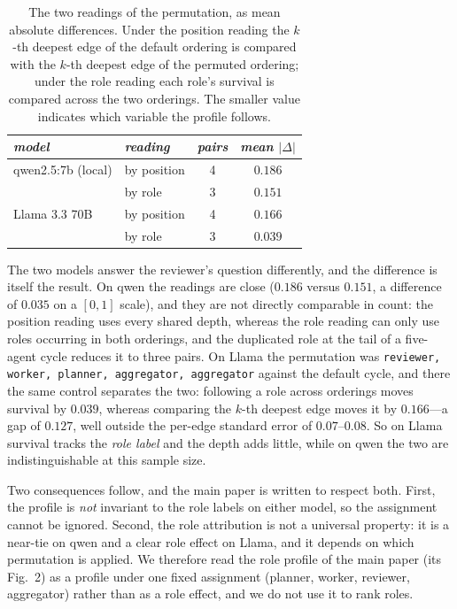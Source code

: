 \documentclass[sigconf,anonymous]{aamas}
\begin{document}
\begin{table}[h]
\scriptsize
\centering
\caption{The two readings of the permutation, as mean absolute differences. Under
the position reading the $k$-th deepest edge of the default ordering is compared with
the $k$-th deepest edge of the permuted ordering; under the role reading each role's
survival is compared across the two orderings. The smaller value indicates which
variable the profile follows.}
\vspace{4pt}
\label{tab:role-perm-readings}
\begin{tabular}{llcc}
\toprule
\textit{model} & \textit{reading} & \textit{pairs} & \textit{mean $|\Delta|$} \\
\midrule
qwen2.5:7b (local) & by position & 4 & $0.186$ \\
                   & by role     & 3 & $0.151$ \\
\midrule
Llama 3.3 70B      & by position & 4 & $0.166$ \\
                   & by role     & 3 & $\mathbf{0.039}$ \\
\bottomrule
\end{tabular}
\end{table}

The two models answer the reviewer's question differently, and the difference is itself
the result. On qwen the readings are close ($0.186$ versus $0.151$, a difference of
$0.035$ on a $[0,1]$ scale), and they are not directly comparable in count: the position
reading uses every shared depth, whereas the role reading can only use roles occurring in
both orderings, and the duplicated role at the tail of a five-agent cycle reduces it to
three pairs. On Llama the permutation was \texttt{reviewer, worker, planner, aggregator,
aggregator} against the default cycle, and there the same control separates the two:
following a role across orderings moves survival by $0.039$, whereas comparing the
$k$-th deepest edge moves it by $0.166$---a gap of $0.127$, well outside the per-edge
standard error of $0.07$--$0.08$. So on Llama survival tracks the \emph{role label} and
the depth adds little, while on qwen the two are indistinguishable at this sample size.

Two consequences follow, and the main paper is written to respect both. First, the
profile is \emph{not} invariant to the role labels on either model, so the assignment
cannot be ignored. Second, the role attribution is not a universal property: it is a
near-tie on qwen and a clear role effect on Llama, and it depends on which permutation
is applied. We therefore read the role profile of the main paper (its Fig.~2) as a
profile under one fixed assignment (planner, worker, reviewer, aggregator) rather than
as a role effect, and we do not use it to rank roles.
\end{document}
